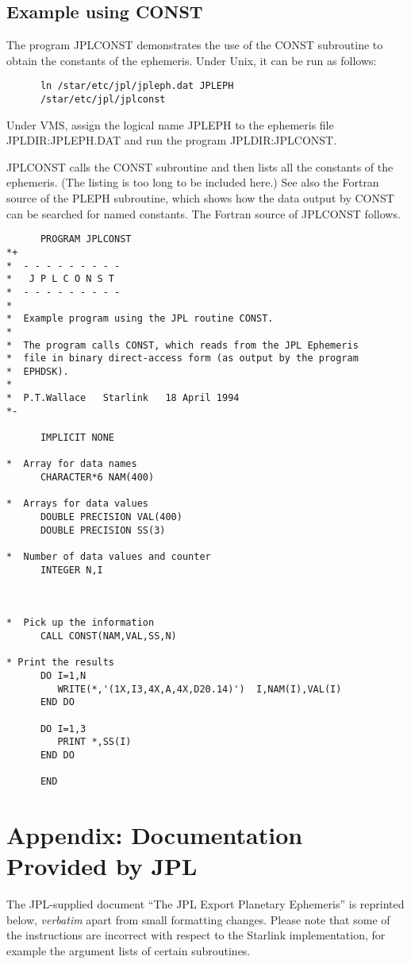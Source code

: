 \subsection{Example using CONST}
The program JPLCONST demonstrates the use of the CONST subroutine to obtain the
constants of the ephemeris.  Under Unix, it can be run as follows:
\begin{verbatim}
      ln /star/etc/jpl/jpleph.dat JPLEPH
      /star/etc/jpl/jplconst
\end{verbatim}
Under VMS, assign the logical name JPLEPH to
the ephemeris file JPLDIR:JPLEPH.DAT
and run the program JPLDIR:JPLCONST.

JPLCONST calls the CONST subroutine and then
lists all the constants of the ephemeris.  (The listing is too long
to be included here.)
See also the Fortran source of the PLEPH subroutine, which shows
how the data output by CONST can be searched for named constants.
The Fortran source of JPLCONST follows.

\begin{verbatim}
      PROGRAM JPLCONST
*+
*  - - - - - - - - -
*   J P L C O N S T
*  - - - - - - - - -
*
*  Example program using the JPL routine CONST.
*
*  The program calls CONST, which reads from the JPL Ephemeris
*  file in binary direct-access form (as output by the program
*  EPHDSK).
*
*  P.T.Wallace   Starlink   18 April 1994
*-

      IMPLICIT NONE

*  Array for data names
      CHARACTER*6 NAM(400)

*  Arrays for data values
      DOUBLE PRECISION VAL(400)
      DOUBLE PRECISION SS(3)

*  Number of data values and counter
      INTEGER N,I



*  Pick up the information
      CALL CONST(NAM,VAL,SS,N)

* Print the results
      DO I=1,N
         WRITE(*,'(1X,I3,4X,A,4X,D20.14)')  I,NAM(I),VAL(I)
      END DO

      DO I=1,3
         PRINT *,SS(I)
      END DO

      END
\end{verbatim}

\newpage
\section{Appendix: Documentation Provided by JPL}
The JPL-supplied
document ``The JPL Export Planetary Ephemeris'' is reprinted below,
{\it verbatim}\/ apart from small formatting changes.  Please
note that some of the instructions are incorrect with respect to the
Starlink implementation, for example the argument lists of certain
subroutines.


